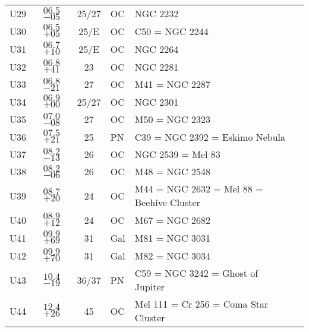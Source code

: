 \begin{table}[p]
\begin{tabular}{lcclll}
U29 &$06.5$ $-05$&25/27&OC &NGC 2232\\
U30 &$06.5$ $+05$&25/E&OC &C50 = NGC 2244\\
U31 &$06.7$ $+10$&25/E&OC &NGC 2264\\
U32 &$06.8$ $+41$&23&OC &NGC 2281\\
U33 &$06.8$ $-21$&27&OC &M41 = NGC 2287\\
U34 &$06.9$ $+00$&25/27&OC &NGC 2301\\
U35 &$07.0$ $-08$&27&OC &M50 = NGC 2323\\
U36 &$07.5$ $+21$&25&PN &C39 = NGC 2392 = Eskimo Nebula\\
U37 &$08.2$ $-13$&26&OC &NGC 2539 = Mel 83\\
U38 &$08.2$ $-06$&26&OC &M48 = NGC 2548\\
U39 &$08.7$ $+20$&24&OC &M44 = NGC 2632 = Mel 88 = Beehive Cluster\\
U40 &$08.9$ $+12$&24&OC &M67 = NGC 2682\\
U41 &$09.9$ $+69$&31&Gal&M81 = NGC 3031\\
U42 &$09.9$ $+70$&31&Gal&M82 = NGC 3034\\
U43 &$10.4$ $-19$&36/37&PN &C59 = NGC 3242 = Ghost of Jupiter\\
U44 &$12.4$ $+26$&45&OC &Mel 111 = Cr 256 = Coma Star Cluster\\
\hline
\end{tabular}
\end{table}
\clearpage

